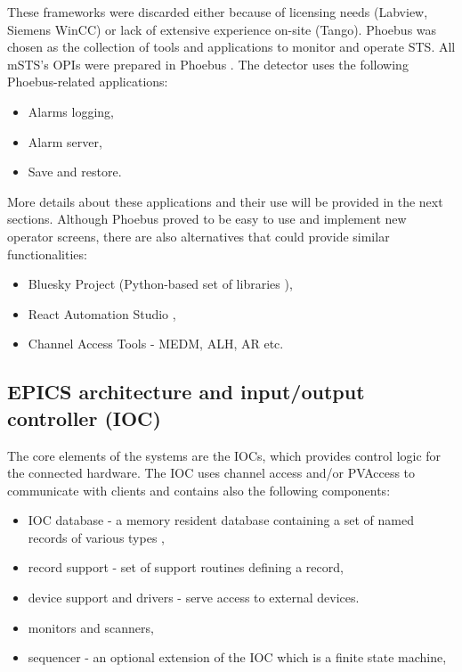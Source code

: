  These frameworks were discarded either because of licensing needs (Labview, Siemens WinCC) or lack of extensive experience on-site (Tango). Phoebus \cite{Phoebus} was chosen as the collection of tools and applications to monitor and operate \gls{STS}. All \gls{mSTS}'s \glspl{OPI} were prepared in Phoebus \cite{Phoebus}. The detector uses the following Phoebus-related applications:
\begin{itemize}
    \item Alarms logging,
    \item Alarm server,
    \item Save and restore.
\end{itemize}
More details about these applications and their use will be provided in the next sections. Although Phoebus proved to be easy to use and implement new operator screens, there are also alternatives that could provide similar functionalities:
\begin{itemize}
    \item Bluesky Project (Python-based set of libraries \cite{Bluesky}),
    \item React Automation Studio \cite{React},
    \item Channel Access Tools - MEDM, \gls{ALH}, \gls{AR} etc. 
\end{itemize}

\subsection{EPICS architecture and input/output controller (IOC)}
The core elements of the systems are the \glspl{IOC}, which provides control logic for the connected hardware. The \gls{IOC} uses channel access and/or PVAccess to communicate with clients and contains also the following components\cite{IOC}:
\begin{itemize}
    \item \gls{IOC} database -  a memory resident database containing a set of named records of various types \cite{IOC2},
    \item record support - set of support routines defining a record,
    \item device support and drivers - serve access to external devices.
    \item monitors and scanners,
    \item sequencer - an optional extension of the \gls{IOC} which is a finite state machine,
\end{itemize}

